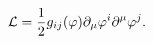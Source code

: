 \begin{equation}
{\cal L}=\frac{1}{2}g_{ij}(\varphi)\partial_{\mu}\varphi^i\partial^{\mu}\varphi^j.\label{nlsm_lagrangian}
\end{equation}

